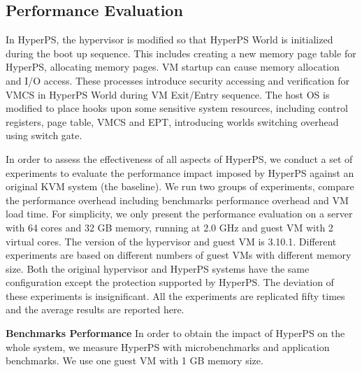 \documentclass[conference]{IEEEtran}
\begin{document}
\subsection{Performance Evaluation}

In HyperPS, the hypervisor is modified so that HyperPS World is initialized during the boot up sequence. This includes creating a new memory page table for HyperPS, allocating memory pages. VM startup can cause memory allocation and I/O access. 
These processes introduce security accessing and verification for VMCS in HyperPS World during VM Exit/Entry sequence.
The host OS is modified to place hooks upon some sensitive system resources, including control registers, page table, VMCS and EPT,
introducing worlds switching overhead using switch gate.

In order to assess the effectiveness of all aspects of HyperPS, we conduct a set of experiments to evaluate the performance impact imposed by HyperPS against an original KVM system (the baseline). We run two groups of experiments, compare the performance overhead including benchmarks performance overhead and VM load time.
For simplicity, we only present the performance evaluation on a server with 64 cores and 32 GB memory, running at 2.0 GHz and guest VM with 2 virtual cores. The version of the hypervisor and guest VM is 3.10.1. Different experiments are based on different numbers of guest VMs with different memory size. Both the original hypervisor and HyperPS systems have the same configuration except the protection supported by HyperPS. The deviation of these experiments is insignificant. All the experiments are replicated fifty times and the average results are reported here.



\textbf{Benchmarks Performance}
In order to obtain the impact of HyperPS on the whole system, we measure HyperPS with microbenchmarks and application benchmarks. 
We use one guest VM with 1 GB memory size. 
\end{document}
